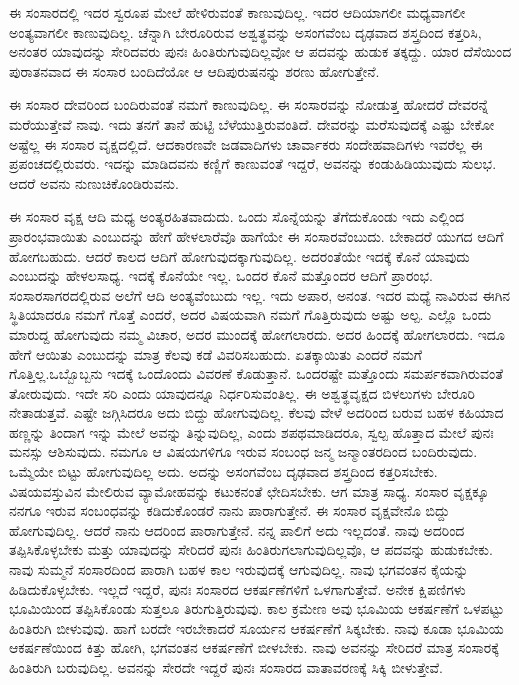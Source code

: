 \begin{artha}
ಈ ಸಂಸಾರದಲ್ಲಿ ಇದರ ಸ್ವರೂಪ ಮೇಲೆ ಹೇಳಿರುವಂತೆ ಕಾಣುವುದಿಲ್ಲ. ಇದರ ಆದಿಯಾಗಲೀ ಮಧ್ಯವಾಗಲೀ ಅಂತ್ಯವಾಗಲೀ ಕಾಣುವುದಿಲ್ಲ. ಚೆನ್ನಾಗಿ ಬೇರೂರಿರುವ ಅಶ್ವತ್ಥವನ್ನು ಅಸಂಗವೆಂಬ ದೃಢವಾದ ಶಸ್ತ್ರದಿಂದ ಕತ್ತರಿಸಿ, ಅನಂತರ ಯಾವುದನ್ನು ಸೇರಿದವರು ಪುನಃ ಹಿಂತಿರುಗುವುದಿಲ್ಲವೋ ಆ ಪದವನ್ನು ಹುಡುಕ ತಕ್ಕದ್ದು. ಯಾರ ದೆಸೆಯಿಂದ ಪುರಾತನವಾದ ಈ ಸಂಸಾರ ಬಂದಿದೆಯೋ ಆ ಆದಿಪುರುಷನನ್ನು ಶರಣು ಹೋಗುತ್ತೇನೆ.
\end{artha}

ಈ ಸಂಸಾರ ದೇವರಿಂದ ಬಂದಿರುವಂತೆ ನಮಗೆ ಕಾಣುವುದಿಲ್ಲ. ಈ ಸಂಸಾರವನ್ನು ನೋಡುತ್ತ ಹೋದರೆ ದೇವರನ್ನೆ ಮರೆಯುತ್ತೇವೆ ನಾವು. ಇದು ತನಗೆ ತಾನೆ ಹುಟ್ಟಿ ಬೆಳೆಯುತ್ತಿರು\-ವಂತಿದೆ. ದೇವರನ್ನು ಮರೆಸುವುದಕ್ಕೆ ಎಷ್ಟು ಬೇಕೋ ಅಷ್ಟೆಲ್ಲ ಈ ಸಂಸಾರ ವೃಕ್ಷದಲ್ಲಿದೆ. ಆದಕಾರಣವೇ ಜಡವಾದಿಗಳು ಚಾರ್ವಾಕರು ಸಂದೇಹವಾದಿಗಳು ಇವರೆಲ್ಲ ಈ ಪ್ರಪಂಚದಲ್ಲಿರುವರು. ಇದನ್ನು ಮಾಡಿದವನು ಕಣ್ಣಿಗೆ ಕಾಣುವಂತೆ ಇದ್ದರೆ, ಅವನನ್ನು ಕಂಡುಹಿಡಿಯುವುದು ಸುಲಭ. ಆದರೆ ಅವನು ನುಣುಚಿಕೊಂಡಿರುವನು.

ಈ ಸಂಸಾರ ವೃಕ್ಷ ಆದಿ ಮಧ್ಯ ಅಂತ್ಯರಹಿತವಾದುದು. ಒಂದು ಸೊನ್ನೆಯನ್ನು ತೆಗೆದುಕೊಂಡು ಇದು ಎಲ್ಲಿಂದ ಪ್ರಾರಂಭವಾಯಿತು ಎಂಬುದನ್ನು ಹೇಗೆ ಹೇಳಲಾರೆವೊ ಹಾಗೆಯೇ ಈ ಸಂಸಾರವೆಂಬುದು. ಬೇಕಾದರೆ ಯುಗದ ಆದಿಗೆ ಹೋಗಬಹುದು. ಆದರೆ ಕಾಲದ ಆದಿಗೆ ಹೋಗುವುದಕ್ಕಾಗುವುದಿಲ್ಲ. ಅದರಂತೆಯೇ ಇದಕ್ಕೆ ಕೊನೆ ಯಾವುದು ಎಂಬುದನ್ನು ಹೇಳಲಸಾಧ್ಯ. ಇದಕ್ಕೆ ಕೊನೆಯೇ ಇಲ್ಲ. ಒಂದರ ಕೊನೆ ಮತ್ತೊಂದರ ಆದಿಗೆ ಪ್ರಾರಂಭ. ಸಂಸಾರಸಾಗರದಲ್ಲಿರುವ ಅಲೆಗೆ ಆದಿ ಅಂತ್ಯವೆಂಬುದು ಇಲ್ಲ. ಇದು ಅಪಾರ, ಅನಂತ. ಇದರ ಮಧ್ಯೆ ನಾವಿರುವ ಈಗಿನ ಸ್ಥಿತಿಯಾದರೂ ನಮಗೆ ಗೊತ್ತೆ ಎಂದರೆ, ಅದರ ವಿಷಯವಾಗಿ ನಮಗೆ ಗೊತ್ತಿರುವುದು ಅಷ್ಟು ಅಲ್ಪ. ಎಲ್ಲೊ ಒಂದು ಮಾರುದ್ದ ಹೋಗುವುದು ನಮ್ಮ ವಿಚಾರ, ಅದರ ಮುಂದಕ್ಕೆ ಹೋಗಲಾರದು. ಅದರ ಹಿಂದಕ್ಕೆ ಹೋಗಲಾರದು. ಇದೂ ಹೇಗೆ ಆಯಿತು ಎಂಬುದನ್ನು ಮಾತ್ರ ಕೆಲವು ಕಡೆ ವಿವರಿಸಬಹುದು. ಏತಕ್ಕಾಯಿತು ಎಂದರೆ ನಮಗೆ ಗೊತ್ತಿಲ್ಲ.\break ಒಬ್ಬೊಬ್ಬನು ಇದಕ್ಕೆ ಒಂದೊಂದು ವಿವರಣೆ ಕೊಡುತ್ತಾನೆ. ಒಂದರಷ್ಟೇ ಮತ್ತೊಂದು ಸಮರ್ಪಕ\-ವಾಗಿರುವಂತೆ ತೋರುವುದು. ಇದೇ ಸರಿ ಎಂದು ಯಾವುದನ್ನೂ ನಿರ್ಧರಿಸುವಂತಿಲ್ಲ. ಈ ಅಶ್ವತ್ಥವೃಕ್ಷದ ಬಿಳಲುಗಳು ಬೇರೂರಿ ನೇತಾಡುತ್ತವೆ. ಎಷ್ಟೇ ಜಗ್ಗಿಸಿದರೂ ಅದು ಬಿದ್ದು ಹೋಗುವುದಿಲ್ಲ. ಕೆಲವು ವೇಳೆ ಅದರಿಂದ ಬರುವ ಬಹಳ ಕಹಿಯಾದ ಹಣ್ಣನ್ನು ತಿಂದಾಗ ಇನ್ನು ಮೇಲೆ ಅವನ್ನು ತಿನ್ನುವುದಿಲ್ಲ, ಎಂದು ಶಪಥಮಾಡಿದರೂ, ಸ್ವಲ್ಪ ಹೊತ್ತಾದ ಮೇಲೆ ಪುನಃ ಮನಸ್ಸು ಆಶಿಸುವುದು. ನಮಗೂ ಆ ವಿಷಯಗಳಿಗೂ ಇರುವ ಸಂಬಂಧ ಜನ್ಮ ಜನ್ಮಾಂತರದಿಂದ ಬಂದಿರುವುದು. ಒಮ್ಮೆಯೇ ಬಿಟ್ಟು ಹೋಗುವುದಿಲ್ಲ ಅದು. ಅದನ್ನು ಅಸಂಗವೆಂಬ ದೃಢವಾದ ಶಸ್ತ್ರದಿಂದ ಕತ್ತರಿಸಬೇಕು. ವಿಷಯವಸ್ತುವಿನ ಮೇಲಿರುವ ವ್ಯಾಮೋಹವನ್ನು ಕಟುಕನಂತೆ ಛೇದಿಸಬೇಕು. ಆಗ ಮಾತ್ರ ಸಾಧ್ಯ. ಸಂಸಾರ ವೃಕ್ಷಕ್ಕೂ ನನಗೂ ಇರುವ ಸಂಬಂಧವನ್ನು ಕಡಿದುಕೊಂಡರೆ ನಾನು ಪಾರಾಗುತ್ತೇನೆ. ಈ ಸಂಸಾರ ವೃಕ್ಷವೇನೊ ಬಿದ್ದು ಹೋಗುವುದಿಲ್ಲ. ಆದರೆ ನಾನು ಆದರಿಂದ ಪಾರಾಗುತ್ತೇನೆ. ನನ್ನ ಪಾಲಿಗೆ ಅದು ಇಲ್ಲದಂತೆ. ನಾವು ಅದರಿಂದ ತಪ್ಪಿಸಿಕೊಳ್ಳಬೇಕು ಮತ್ತು ಯಾವುದನ್ನು ಸೇರಿದರೆ ಪುನಃ ಹಿಂತಿರುಗಲಾಗುವುದಿಲ್ಲವೊ, ಆ ಪದವನ್ನು ಹುಡುಕಬೇಕು. ನಾವು ಸುಮ್ಮನೆ ಸಂಸಾರದಿಂದ ಪಾರಾಗಿ ಬಹಳ ಕಾಲ ಇರುವುದಕ್ಕೆ ಆಗುವುದಿಲ್ಲ. ನಾವು ಭಗವಂತನ ಕೈಯನ್ನು ಹಿಡಿದುಕೊಳ್ಳಬೇಕು. ಇಲ್ಲದೆ ಇದ್ದರೆ, ಪುನಃ ಸಂಸಾರದ ಆಕರ್ಷಣೆಗಳಿಗೆ ಒಳಗಾಗುತ್ತೇವೆ. ಅನೇಕ ಕ್ಷಿಪಣಿಗಳು ಭೂಮಿಯಿಂದ ತಪ್ಪಿಸಿಕೊಂಡು ಸುತ್ತಲೂ ತಿರುಗುತ್ತಿರುವುವು. ಕಾಲ ಕ್ರಮೇಣ ಅವು ಭೂಮಿಯ ಆಕರ್ಷಣೆಗೆ ಒಳಪಟ್ಟು ಹಿಂತಿರುಗಿ ಬೀಳುವುವು. ಹಾಗೆ ಬರದೇ ಇರಬೇಕಾದರೆ ಸೂರ್ಯನ ಆಕರ್ಷಣೆಗೆ ಸಿಕ್ಕಬೇಕು. ನಾವು ಕೂಡಾ ಭೂಮಿಯ ಆಕರ್ಷಣೆಯಿಂದ ಕಿತ್ತು ಹೋಗಿ, ಭಗವಂತನ ಆಕರ್ಷಣೆಗೆ ಬೀಳಬೇಕು. ನಾವು ಅವನನ್ನು ಸೇರಿದರೆ ಮಾತ್ರ ಸಂಸಾರಕ್ಕೆ ಹಿಂತಿರುಗಿ ಬರುವುದಿಲ್ಲ. ಅವನನ್ನು ಸೇರದೇ ಇದ್ದರೆ ಪುನಃ ಸಂಸಾರದ ವಾತಾವರಣಕ್ಕೆ ಸಿಕ್ಕಿ ಬೀಳುತ್ತೇವೆ.

